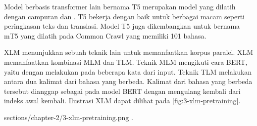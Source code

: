 Model berbasis transformer lain bernama T5  merupakan model yang dilatih dengan campuran   dan .
T5 bekerja dengan baik untuk berbagai macam  seperti peringkasan teks dan translasi.
Model T5 juga dikembangkan untuk \mwordem{} bernama mT5  yang dilatih pada Common Crawl yang memiliki 101 bahasa.

\gls{XLM} menunjukkan sebuah teknik \pretraining{} lain untuk memanfaatkan korpus paralel.
\gls{XLM} memanfaatkan kombinasi \gls{MLM} dan \gls{TLM}.
Teknik \pretraining{} \gls{MLM} mengikuti cara \pretraining{} \gls{BERT}, yaitu dengan melakukan  pada beberapa kata dari input.
Teknik \pretraining{} \gls{TLM} melakukan  antara dua kalimat dari bahasa yang berbeda.
Kalimat dari bahasa yang berbeda tersebut dianggap sebagai  pada model \gls{BERT} dengan mengulang kembali  dari indeks awal kembali.
Ilustrasi \pretraining{} \gls{XLM} dapat dilihat pada \cref{fig:3-xlm-pretraining}.

  {sections/chapter-2/3-xlm-pretraining.png}
  { \pretraining{} .}
